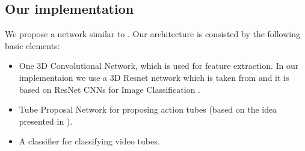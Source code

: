 \documentclass{report}
\begin{document}




\subsection{Our implementation}
We propose a network similar to \cite{DBLP:journals/corr/HouCS17}. Our architecture is consisted by the following basic elements:
\begin{itemize}
\item One 3D Convolutional Network, which is used for feature extraction. In our implementaion we use a 3D Resnet network which is taken from
  \cite{hara3dcnns} and it is based on ResNet CNNs for Image Classification \cite{DBLP:journals/corr/HeZRS15}.
\item Tube Proposal Network for proposing action tubes (based on the idea presented in \cite{DBLP:journals/corr/HouCS17}).
\item A classifier for classifying video tubes.
\end{itemize}
  

% 
% 

\printbibliography
\end{document}

